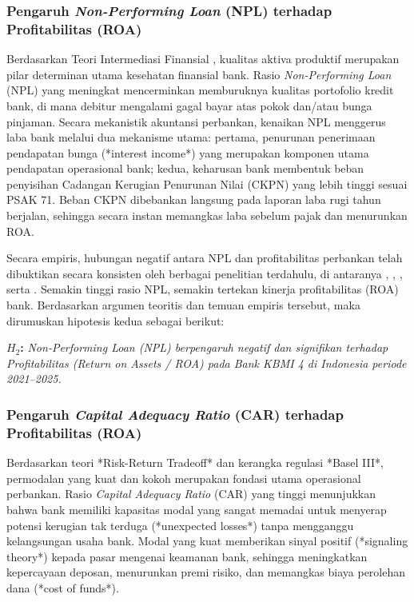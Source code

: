 \documentclass[12pt,a4paper]{article}
\numberwithin{equation}{section}
\begin{document}
\subsubsection{Pengaruh \emph{Non-Performing Loan} (NPL) terhadap Profitabilitas (ROA)}
\noindent
Berdasarkan Teori Intermediasi Finansial \citep{GurleyShaw1960, Diamond1984}, kualitas aktiva produktif merupakan pilar determinan utama kesehatan finansial bank. Rasio \emph{Non-Performing Loan} (NPL) yang meningkat mencerminkan memburuknya kualitas portofolio kredit bank, di mana debitur mengalami gagal bayar atas pokok dan/atau bunga pinjaman. Secara mekanistik akuntansi perbankan, kenaikan NPL menggerus laba bank melalui dua mekanisme utama: pertama, penurunan penerimaan pendapatan bunga (*interest income*) yang merupakan komponen utama pendapatan operasional bank; kedua, keharusan bank membentuk beban penyisihan Cadangan Kerugian Penurunan Nilai (CKPN) yang lebih tinggi sesuai PSAK 71. Beban CKPN dibebankan langsung pada laporan laba rugi tahun berjalan, sehingga secara instan memangkas laba sebelum pajak dan menurunkan ROA.

\noindent
Secara empiris, hubungan negatif antara NPL dan profitabilitas perbankan telah dibuktikan secara konsisten oleh berbagai penelitian terdahulu, di antaranya \citet{PraditaSyaichu2022}, \citet{HandayaniSubowo2022}, \citet{HaryantoSudarno2023}, serta \citet{KuncoroSuhardjono2018}. Semakin tinggi rasio NPL, semakin tertekan kinerja profitabilitas (ROA) bank. Berdasarkan argumen teoritis dan temuan empiris tersebut, maka dirumuskan hipotesis kedua sebagai berikut:

\vspace{0.2cm}
\noindent \textbf{$H_2$:} \emph{Non-Performing Loan (NPL) berpengaruh negatif dan signifikan terhadap Profitabilitas (Return on Assets / ROA) pada Bank KBMI 4 di Indonesia periode 2021--2025.}

\subsubsection{Pengaruh \emph{Capital Adequacy Ratio} (CAR) terhadap Profitabilitas (ROA)}
\noindent
Berdasarkan teori *Risk-Return Tradeoff* \citep{BrighamEhrhardt2020} dan kerangka regulasi *Basel III*, permodalan yang kuat dan kokoh merupakan fondasi utama operasional perbankan. Rasio \emph{Capital Adequacy Ratio} (CAR) yang tinggi menunjukkan bahwa bank memiliki kapasitas modal yang sangat memadai untuk menyerap potensi kerugian tak terduga (*unexpected losses*) tanpa mengganggu kelangsungan usaha bank. Modal yang kuat memberikan sinyal positif (*signaling theory*) kepada pasar mengenai keamanan bank, sehingga meningkatkan kepercayaan deposan, menurunkan premi risiko, dan memangkas biaya perolehan dana (*cost of funds*).
\end{document}
